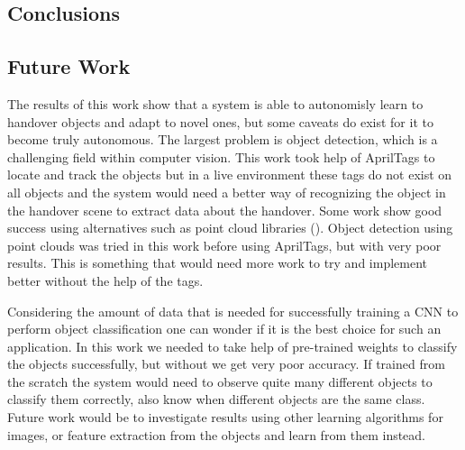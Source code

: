\subsection{Conclusions}


\subsection{Future Work}

The results of this work show that a system is able to autonomisly learn to handover objects and adapt to novel ones, but some caveats do exist for it to become truly autonomous. The largest problem is object detection, which is a challenging field within computer vision. This work took help of AprilTags to locate and track the objects but in a live environment these tags do not exist on all objects and the system would need a better way of recognizing the object in the handover scene to extract data about the handover. Some work show good success using alternatives such as point cloud libraries (\parencite{Chan2015a}). Object detection using point clouds was tried in this work before using AprilTags, but with very poor results. This is something that would need more work to try and implement better without the help of the tags.

Considering the amount of data that is needed for successfully training a CNN to perform object classification one can wonder if it is the best choice for such an application. In this work we needed to take help of pre-trained weights to classify the objects successfully, but without we get very poor accuracy. If trained from the scratch the system would need to observe quite many different objects to classify them correctly, also know when different objects are the same class. Future work would be to investigate results using other learning algorithms for images, or feature extraction from the objects and learn from them instead.

